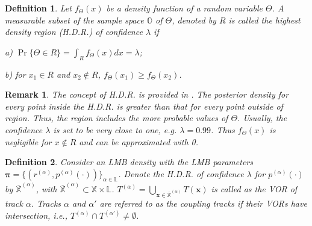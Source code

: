 \documentclass[journal]{IEEEtran}
\newcommand{\bx}{{\mathbf x}}
\newcommand{\bpi}{{\boldsymbol\pi}}
\newtheorem{Def}{Definition}
\newtheorem{Rem}{Remark}
\begin{document}
{\begin{Def}\label{definition:3}
Let $f_{\Theta}(x)$ be a density function of a random variable $\Theta$. A measurable subset of  the sample space $\mathbb{O}$ of $\Theta$, denoted by $R$ is called the highest  density  region (H.D.R.) of confidence $\lambda$ if
 
a) $\Pr\{\Theta\in R\} = \int_{R} f_\Theta (x) d x=\lambda$;
 
b) for $x_1\in R$ and $x_2\notin R$, $f_{\Theta}(x_1)\geqslant f_{\Theta}(x_2)$.
\end{Def}

\begin{Rem}\label{remark:6} The concept of H.D.R. is provided in \cite{refr:HPD,refr:HDR}. The posterior density for every point inside the H.D.R.  is greater than that for every point outside of region. Thus, the region includes the more probable values of $\Theta$. Usually, the confidence $\lambda$ is set to be very close to one, e.g. $\lambda= 0.99$. Thus $f_\Theta(\!x\!)$ is negligible for $x\!\notin\!R$ and can be approximated with 0.
\end{Rem}

\begin{Def}\label{definition:4}
Consider an LMB density with the LMB parameters $\bpi=\{(r^{(\alpha)},p^{(\alpha)}(\cdot))\}_{\alpha\in\mathbb{L}}$.  Denote the H.D.R. of
confidence $\lambda$ for $p^{(\alpha)}(\cdot)$  by $\overline{\mathbb{X}}^{(\alpha)}$, with $\overline{\mathbb{X}}^{(\alpha)}\subset\mathbb{X}\times\mathbb{L}$.   $T^{(\alpha)}=\bigcup_{\bx\in \overline{\mathbb{X}}^{(\alpha)}}T(\bx)$ is called as the VOR of track 
$\alpha$. Tracks $\alpha$ and $\alpha'$ are referred to as the coupling tracks   if their  VORs  have intersection, i.e., $T^{(\alpha)}\cap T^{(\alpha')}\neq\emptyset$.
\end{Def}



}
\end{document}

